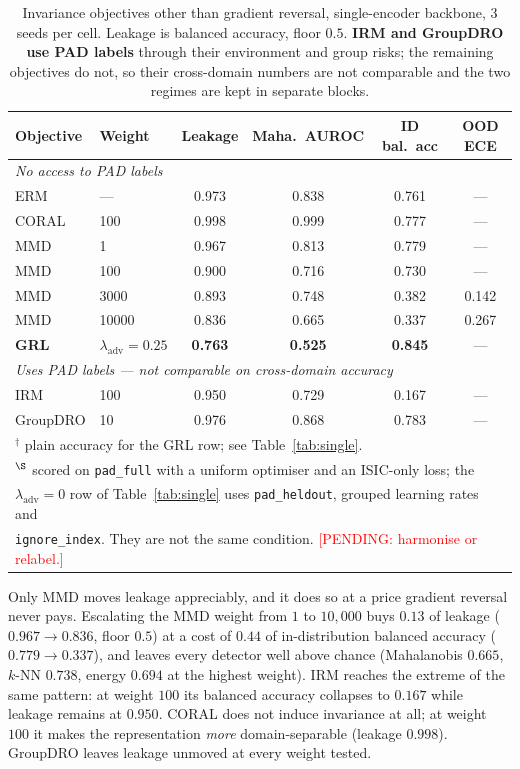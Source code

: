 \documentclass[11pt,a4paper]{article}
\newcommand{\pending}[1]{\textcolor{red}{[PENDING: #1]}}
\newcommand{\lam}{\lambda_{\mathrm{adv}}}
\begin{document}
\begin{table}[t]
\centering
\small
\caption{Invariance objectives other than gradient reversal, single-encoder backbone,
3 seeds per cell. Leakage is balanced accuracy, floor $0.5$. \textbf{IRM and GroupDRO
use PAD labels} through their environment and group risks; the remaining objectives do
not, so their cross-domain numbers are not comparable and the two regimes are kept in
separate blocks.}
\label{tab:obj}
\begin{tabular}{llcccc}
\toprule
Objective & Weight & Leakage & Maha.\ AUROC & ID bal.\ acc & OOD ECE \\
\midrule
\multicolumn{6}{l}{\emph{No access to PAD labels}}\\
ERM\rlap{$^{\S}$} & ---    & 0.973 & 0.838 & 0.761 & --- \\
CORAL        & 100    & 0.998 & 0.999 & 0.777 & --- \\
MMD          & 1      & 0.967 & 0.813 & 0.779 & --- \\
MMD          & 100    & 0.900 & 0.716 & 0.730 & --- \\
MMD          & 3000   & 0.893 & 0.748 & 0.382 & 0.142 \\
MMD          & 10000  & 0.836 & 0.665 & 0.337 & 0.267 \\
\textbf{GRL} & $\lam = 0.25$ & \textbf{0.763} & \textbf{0.525} & \textbf{0.845\rlap{$^\dagger$}} & --- \\
\midrule
\multicolumn{6}{l}{\emph{Uses PAD labels --- not comparable on cross-domain accuracy}}\\
IRM          & 100    & 0.950 & 0.729 & 0.167 & --- \\
GroupDRO     & 10     & 0.976 & 0.868 & 0.783 & --- \\
\bottomrule
\multicolumn{6}{l}{\footnotesize $^\dagger$ plain accuracy for the GRL row; see Table~\ref{tab:single}.}\\
\multicolumn{6}{l}{\footnotesize $^{\S}$ scored on \texttt{pad\_full} with a uniform optimiser and an ISIC-only loss; the}\\
\multicolumn{6}{l}{\footnotesize \phantom{$^{\S}$} $\lam{=}0$ row of Table~\ref{tab:single} uses \texttt{pad\_heldout}, grouped learning rates and}\\
\multicolumn{6}{l}{\footnotesize \phantom{$^{\S}$} \texttt{ignore\_index}. They are not the same condition. \pending{harmonise or relabel.}}
\end{tabular}
\end{table}

Only MMD moves leakage appreciably, and it does so at a price gradient reversal never
pays. Escalating the MMD weight from $1$ to $10{,}000$ buys $0.13$ of leakage
($0.967 \to 0.836$, floor $0.5$) at a cost of $0.44$ of in-distribution balanced
accuracy ($0.779 \to 0.337$), and leaves every detector well above chance
(Mahalanobis $0.665$, $k$-NN $0.738$, energy $0.694$ at the highest weight). IRM
reaches the extreme of the same pattern: at weight $100$ its balanced accuracy collapses
to $0.167$ while leakage remains at $0.950$. CORAL does not induce invariance at all;
at weight $100$ it makes the representation \emph{more} domain-separable
(leakage $0.998$). GroupDRO leaves leakage unmoved at every weight tested.
\end{document}
